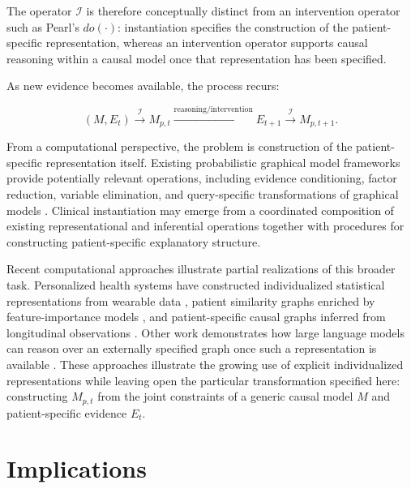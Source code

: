 \documentclass[11pt]{article}
\begin{document}
The operator $\mathcal{I}$ is therefore conceptually distinct from an intervention operator such as Pearl's $do(\cdot)$: instantiation specifies the construction of the patient-specific representation, whereas an intervention operator supports causal reasoning within a causal model once that representation has been specified.

As new evidence becomes available, the process recurs:

\[
(M,E_t)
\xrightarrow{\mathcal{I}}
M_{p,t}
\xrightarrow{\text{reasoning/intervention}}
E_{t+1}
\xrightarrow{\mathcal{I}}
M_{p,t+1}.
\]

From a computational perspective, the problem is construction of the patient-specific representation itself. Existing probabilistic graphical model frameworks provide potentially relevant operations, including evidence conditioning, factor reduction, variable elimination, and query-specific transformations of graphical models \parencite{koller_probabilistic_2009,pearl_causality_2013}. Clinical instantiation may emerge from a coordinated composition of existing representational and inferential operations together with procedures for constructing patient-specific explanatory structure.

Recent computational approaches illustrate partial realizations of this broader task. Personalized health systems have constructed individualized statistical representations from wearable data \parencite{fang_physiollm_2024}, patient similarity graphs enriched by feature-importance models \parencite{subramanian_graph-augmented_2024}, and patient-specific causal graphs inferred from longitudinal observations \parencite{yang_chatdiet_2024,yang_personalized_2025}. Other work demonstrates how large language models can reason over an externally specified graph once such a representation is available \parencite{luo_reasoning_2024}. These approaches illustrate the growing use of explicit individualized representations while leaving open the particular transformation specified here: constructing $M_{p,t}$ from the joint constraints of a generic causal model $M$ and patient-specific evidence $E_t$.

\section{Implications}

\end{document}
